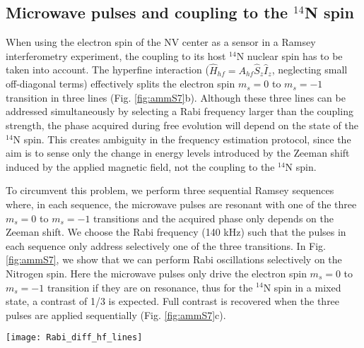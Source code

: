 \subsection{Microwave pulses and coupling to the $^{14}$N spin}
\label{sec:ammMW}
When using the electron spin of the NV center as a sensor in a Ramsey interferometry experiment, the coupling to its host $^{14}$N nuclear spin has to be taken into account. The hyperfine interaction ($\hat{H}_{hf}=A_{hf} \hat{S}_z \hat{I}_z$, neglecting small off-diagonal terms) effectively splits the electron spin $m_s = 0 $ to $m_s = -1$ transition in three lines (Fig. \ref{fig:ammS7}b).  Although these three lines can be addressed simultaneously by selecting a Rabi frequency larger than the coupling strength, the phase acquired during free evolution will depend on the state of the $^{14}$N spin. This creates ambiguity in the frequency estimation protocol, since the aim is to sense only the change in energy levels introduced by the Zeeman shift induced by the applied magnetic field, not the coupling to the $^{14}$N spin.

To circumvent this problem, we perform three sequential Ramsey sequences where, in each sequence, the microwave pulses are resonant with one of the three $m_s = 0$ to $m_s = -1$ transitions and the acquired phase only depends on the Zeeman shift. We choose the Rabi frequency (140 kHz) such that the pulses in each sequence only address selectively one of the three transitions. In Fig. \ref{fig:ammS7}, we show that we can perform Rabi oscillations selectively on the Nitrogen spin. Here the microwave pulses only drive the electron spin $m_s = 0$ to $m_s = -1$ transition if they are on resonance, thus for the $^{14}$N spin in a mixed state, a contrast of 1/3 is expected. Full contrast is recovered when the three pulses are applied sequentially (Fig. \ref{fig:ammS7}c).

\begin{figure*}
	\centering
	\texttt{[image: Rabi\_diff\_hf\_lines]}
	\caption{\label{fig:ammS7} \textbf{Electron spin driving.} a) Rabi oscillations of the electron spin conditional on the state of the  nitrogen spin ($^{14}$N , $I = 1$). We tune the frequency of the microwave pulses in resonance with one of the three $m_s = 0$ to $m_s = -1$ transitions, corresponding to the nitrogen spin being either in $m_I = -1 , 0$ or $+1$ (top, middle bottom) and vary the length of the pulse. From a sinusoidal fit (grey line) we find Rabi frequencies of  (144, 140 and 142 $\pm$ 2 kHz) respectively b) Energy level spectrum for the electron $m_s = 0$ to $m_s = -1$ transition. We initialize the electron spin in $m_s = 0$ and then vary the frequency of a microwave pulse with fixed length. The pulse detuning is with respect to a reference frequency of 2.845334 GHz.  The spectrum shows three lines owing to the hyperfine interaction with the $^{14}$N spin with $|A_{hf}| = 2\pi x (2.185  \pm 0.006)$ MHz. c) Rabi oscillation of the electron spin unconditional on the state of the nitrogen spin. We apply three sequential microwave pulses each on resonance with one of the hyperfine lines. From the sinusoidal fit (grey line) we find a Rabi frequency of $(142 \pm 3)$ kHz.}
\end{figure*}

